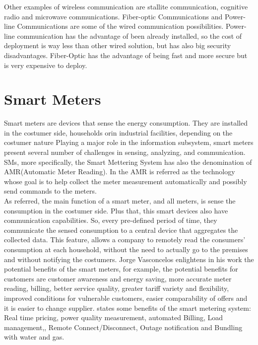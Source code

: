 Other examples of wireless communication are stallite communication, cognitive radio and  microwave communications.
Fiber-optic Communications and Power-line Communications are some of the wired communication possibilities. Power-line communication has the advantage of been already installed, so the cost of deployment is way less than other wired solution, but has also big security disadvantages. Fiber-Optic has the advantage of being fast and more secure but is very expensive to deploy.\\




\section{Smart Meters}
Smart meters are devices that sense the energy consumption. They are installed in the costumer side,  households orin  industrial facilities, depending on the costumer nature Playing a major role in the information subsystem, smart meters present several number of challenges in sensing, analyzing, and communication\cite{journals/spm/ErkinTLP13}. SMs, more specifically, the Smart Mettering System has also the denomination of AMR(Automatic Meter Reading). In \cite{khalifa2011survey} the AMR is referred as the technology whose goal is to help collect the meter measurement automatically and possibly send commands to the meters.\\
As referred, the main function of a smart meter, and all meters, is sense the consumption in the costumer side. Plus that, this smart devices also have communication capabilities. So, every pre-defined period of time, they communicate the sensed consumption to a central device that aggregates the collected data. This feature, allows a company to remotely read the consumers' consumption at each household, without the need to actually go to the premises and without notifying the costumers\cite{Ericsson_2}. Jorge Vasconcelos \cite{RePEc:erp:euirsc:p0193} enlightens in his work the potential benefits of the smart meters, for  example, the potential benefits for customers are customer awareness and energy saving, more accurate meter reading, billing, better service quality, greater tariff variety and flexibility, improved conditions for vulnerable customers, easier comparability of offers and it is easier to change supplier. \cite{khalifa2011survey} states some benefits of the smart metering system: Real time pricing, power quality measurement, automated Billing, Load management,, Remote Connect/Disconnect, Outage notification and Bundling with water and gas.\\
